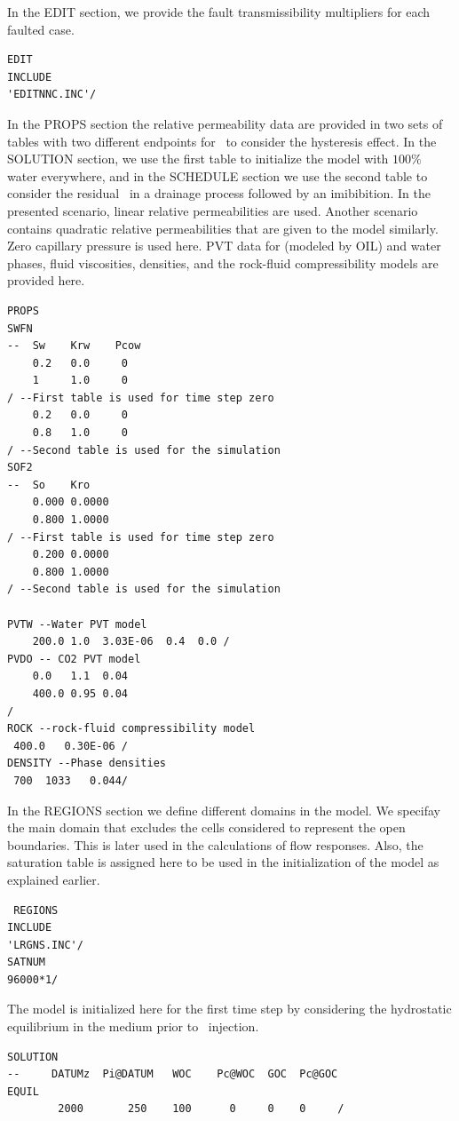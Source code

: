 In the EDIT section, we provide the fault transmissibility multipliers for each faulted case.
\begin{lstlisting}
EDIT
INCLUDE
'EDITNNC.INC'/ 
\end{lstlisting}
In the PROPS section the relative permeability data are provided in two sets of tables with two different endpoints for \coo\ to consider the hysteresis effect. In the SOLUTION section, we use the first table to initialize the model with $100\%$ water everywhere, and in the SCHEDULE section we use the second table to consider the residual \coo\ in a drainage process followed by an imibibition.  In the presented scenario, linear relative permeabilities are used. Another scenario contains quadratic relative permeabilities that are given to the model similarly. Zero capillary pressure is used here. PVT data for \coo(modeled by OIL) and water phases, fluid viscosities, densities, and the rock-fluid compressibility models are provided here.  
\begin{lstlisting}
PROPS 
SWFN 
--  Sw    Krw    Pcow 
    0.2   0.0     0 
    1     1.0     0 
/ --First table is used for time step zero
    0.2   0.0     0 
    0.8   1.0     0 
/ --Second table is used for the simulation
SOF2       
--  So    Kro     
    0.000 0.0000 
    0.800 1.0000 
/ --First table is used for time step zero 
    0.200 0.0000 
    0.800 1.0000 
/ --Second table is used for the simulation

PVTW --Water PVT model
    200.0 1.0  3.03E-06  0.4  0.0 / 
PVDO -- CO2 PVT model
    0.0   1.1  0.04 
    400.0 0.95 0.04 
/ 
ROCK --rock-fluid compressibility model
 400.0   0.30E-06 / 
DENSITY --Phase densities
 700  1033   0.044/ 
\end{lstlisting}
In the REGIONS section we define different domains in the model. We specifay the main domain that excludes the cells considered to represent the open boundaries. This is later used in the calculations of flow responses. Also, the saturation table is assigned here to be used in the initialization of the model as explained earlier.
\begin{lstlisting}
 REGIONS 
INCLUDE 
'LRGNS.INC'/ 
SATNUM 
96000*1/ 
\end{lstlisting}
The model is initialized here for the first time step by considering the hydrostatic equilibrium in the medium prior to \coo\ injection. 
\begin{lstlisting}
SOLUTION 
--     DATUMz  Pi@DATUM   WOC    Pc@WOC  GOC  Pc@GOC 
EQUIL 
        2000       250    100      0     0    0     / 
\end{lstlisting}
